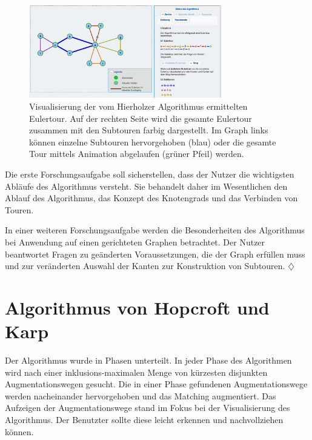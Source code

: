 \begin{figure}[h!]
	\centering
	\includegraphics[width=0.75\textwidth]{figures/hierholzer_animation}
	\caption[Hierholzer: Eulertour Animation]{Visualisierung der vom Hierholzer Algorithmus ermittelten Eulertour. Auf der rechten Seite wird die gesamte Eulertour zusammen mit den Subtouren farbig dargestellt. Im Graph links können einzelne Subtouren hervorgehoben (blau) oder die gesamte Tour mittels Animation abgelaufen (grüner Pfeil) werden.}\label{fig:hierholzer-animation}
\end{figure}

Die erste Forschungsaufgabe soll sicherstellen, dass der Nutzer die wichtigsten Abläufe des Algorithmus versteht. Sie behandelt daher im Wesentlichen den Ablauf des Algorithmus, das Konzept des Knotengrads und das Verbinden von Touren.

In einer weiteren Forschungsaufgabe werden die Besonderheiten des Algorithmus bei Anwendung auf einen gerichteten Graphen betrachtet. Der Nutzer beantwortet Fragen zu geänderten Voraussetzungen, die der Graph erfüllen muss und zur veränderten Auswahl der Kanten zur Konstruktion von Subtouren. \hfill$\diamondsuit$
     
\section{Algorithmus von Hopcroft und Karp} %

Der Algorithmus wurde in Phasen unterteilt. In jeder Phase des Algorithmen wird nach einer inklusions-maximalen Menge von kürzesten disjunkten Augmentationswegen gesucht. Die in einer Phase gefundenen Augmentationswege werden nacheinander hervorgehoben und das Matching augmentiert.
Das Aufzeigen der Augmentationswege stand im Fokus bei der Visualisierung des Algorithmus. Der Benutzter sollte diese leicht erkennen und nachvollziehen können. 

